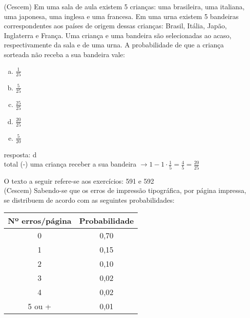 \begin{ex}
 (Cescem) Em uma sala de aula existem 5 crianças: uma brasileira, uma italiana, uma japonesa, uma inglesa e uma francesa. Em uma urna existem 5 bandeiras correspondentes aos países de origem dessas crianças: Brasil, Itália, Japão, Inglaterra e França. Uma criança e uma bandeira são selecionadas ao acaso, respectivamente da sala e de uma urna. A probabilidade de que a criança sorteada não receba a sua bandeira vale:
   \begin{enumerate}[(a)]
   \item $\frac{1}{25}$
   \item $\frac{5}{25}$
   \item $\frac{25}{25}$
   \item $\frac{20}{25}$
   \item $\frac{5}{20}$
   \end{enumerate}
    \begin{sol}
     resposta: d \\
     total (-) uma criança receber a sua bandeira 
     $\rightarrow  1-1\cdot\frac{1}{5}=\frac{4}{5}=\frac{20}{25}$
    \end{sol}

O texto a seguir refere-se aos exercícios: 591 e 592\\
(Cescem)  Sabendo-se que os erros de impressão tipográfica, por página impressa, se distribuem de acordo com as seguintes probabilidades:
\begin{center}
\begin{tabular}{|c|c|} \hline
Nº erros/página & Probabilidade  \\  \hline
0  & 0,70 \\  \hline
1  & 0,15 \\  \hline
2  & 0,10 \\  \hline
3  & 0,02  \\ \hline
4  & 0,02  \\ \hline
5 ou + & 0,01 \\ \hline
\end{tabular}
\end{center}
\end{ex}